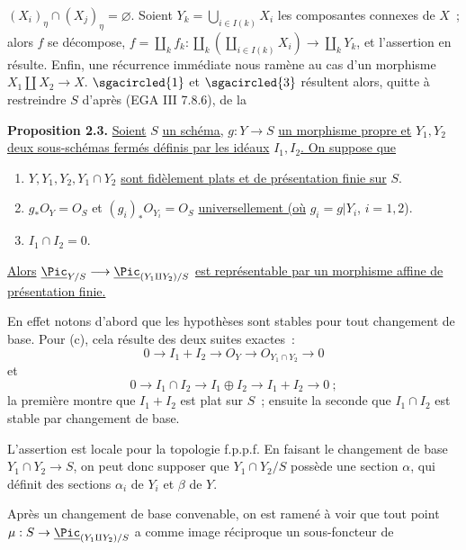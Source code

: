 
\((X_i)_\eta\cap(X_j)_\eta=\varnothing\). Soient \(Y_k=\bigcup_{i\in I(k)}X_i\) les composantes connexes de \(X\)~; alors \(f\) se décompose, \(f=\coprod_k f_k:\coprod_k(\coprod_{i\in I(k)}X_i)\longrightarrow \coprod_kY_k\), et l'assertion en résulte. Enfin, une récurrence immédiate nous ramène au cas d'un morphisme \(X_1\amalg X_2\to X\). \(\sgacircled{1}\) et \(\sgacircled{3}\) résultent alors, quitte à restreindre \(S\) d'après (EGA III 7.8.6), de la

\textbf{Proposition 2.3.} \uline{Soient} \(S\) \uline{un schéma,} \(g:Y\to S\) \uline{un morphisme propre et} \(Y_1,Y_2\) \uline{deux sous-schémas fermés définis par les idéaux} \(I_1,I_2\)\uline{. On suppose que}
\begin{enumerate}[label=\alph*)]
\item \(Y,Y_1,Y_2,Y_1\cap Y_2\) \uline{sont fidèlement plats et de présentation finie sur} \(S\).
\item \(g_*{O}_Y={O}_S\) et \((g_i)_*{O}_{Y_i}={O}_S\) \uline{universellement (où} \(g_i=g|Y_i\), \(i=1,2\)).
\item \(I_1\cap I_2=0\).
\end{enumerate}
\uline{Alors} \(\underline{\Pic}_{Y/S}\longrightarrow \underline{\Pic}_{(Y_1\amalg Y_2)/S}\) \uline{est représentable par un morphisme affine de présentation finie.}

En effet notons d'abord que les hypothèses sont stables pour tout changement de base. Pour (c), cela résulte des deux suites exactes~:
\[
  0\longrightarrow I_1+I_2\longrightarrow{O}_Y
  \longrightarrow{O}_{Y_1\cap Y_2}\longrightarrow0
\]
et
\[
  0\longrightarrow I_1\cap I_2\longrightarrow I_1\oplus I_2
  \longrightarrow I_1+I_2\longrightarrow0~;
\]
la première montre que \(I_1+I_2\) est plat sur \(S\)~; ensuite la seconde que \(I_1\cap I_2\) est stable par changement de base.

L'assertion est locale pour la topologie f.p.p.f. En faisant le changement de base \(Y_1\cap Y_2\to S\), on peut donc supposer que \(Y_1\cap Y_2/S\) possède une section \(\alpha\), qui définit des sections \(\alpha_i\) de \(Y_i\) et \(\beta\) de \(Y\).

Après un changement de base convenable, on est ramené à voir que tout point \(\mu:S\to\underline{\Pic}_{(Y_1\amalg Y_2)/S}\) a comme image réciproque un sous-foncteur de
